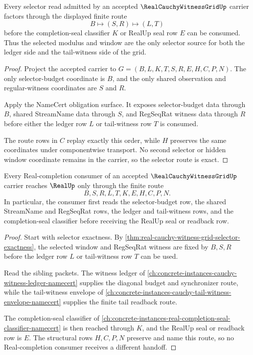 \begin{theorem}
\label{thm:real-cauchy-witness-grid-selector-exactness}
Every selector read admitted by an accepted $\RealCauchyWitnessGridUp$ carrier factors through the displayed finite route
$$
B \longmapsto (S,R) \longmapsto (L,T)
$$
before the completion-seal classifier $K$ or RealUp seal row $E$ can be consumed. Thus the selected modulus and window are the only selector source for both the ledger side and the tail-witness side of the grid.
\end{theorem}
\begin{proof}
Project the accepted carrier to $G=(B,L,K,T,S,R,E,H,C,P,N)$. The only selector-budget coordinate is $B$, and the only shared observation and regular-witness coordinates are $S$ and $R$.

Apply the NameCert obligation surface. It exposes selector-budget data through $B$, shared StreamName data through $S$, and RegSeqRat witness data through $R$ before either the ledger row $L$ or tail-witness row $T$ is consumed.

The route rows in $C$ replay exactly this order, while $H$ preserves the same coordinates under componentwise transport. No second selector or hidden window coordinate remains in the carrier, so the selector route is exact.
\end{proof}

\begin{theorem}
\label{thm:real-cauchy-witness-grid-real-handoff}
Every Real-completion consumer of an accepted $\RealCauchyWitnessGridUp$ carrier reaches $\RealUp$ only through the finite route
$$
B,S,R,L,T,K,E,H,C,P,N.
$$
In particular, the consumer first reads the selector-budget row, the shared StreamName and RegSeqRat rows, the ledger and tail-witness rows, and the completion-seal classifier before receiving the RealUp seal or readback row.
\end{theorem}
\begin{proof}
Start with selector exactness. By \autoref{thm:real-cauchy-witness-grid-selector-exactness}, the selected window and RegSeqRat witness are fixed by $B,S,R$ before the ledger row $L$ or tail-witness row $T$ can be used.

Read the sibling packets. The witness ledger of \autoref{ch:concrete-instances-cauchy-witness-ledger-namecert} supplies the diagonal budget and synchronizer route, while the tail-witness envelope of \autoref{ch:concrete-instances-cauchy-tail-witness-envelope-namecert} supplies the finite tail readback route.

The completion-seal classifier of \autoref{ch:concrete-instances-real-completion-seal-classifier-namecert} is then reached through $K$, and the RealUp seal or readback row is $E$. The structural rows $H,C,P,N$ preserve and name this route, so no Real-completion consumer receives a different handoff.
\end{proof}

